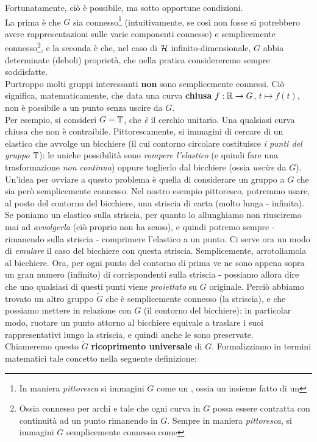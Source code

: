 \documentclass[../../FisicaTeorica.tex]{subfiles}
\begin{document}
Fortunatamente, ciò è possibile, ma sotto opportune condizioni.\\
La prima è che $G$ sia connesso\footnote{In maniera \textit{pittoresca} si immagini $G$ come un , ossia un insieme fatto di un } (intuitivamente, se così non fosse si potrebbero avere rappresentazioni  sulle varie componenti connesse) e semplicemente connesso\footnote{Ossia connesso per archi e tale che ogni curva in $G$ possa essere contratta con continuità ad un punto rimanendo in $G$. Sempre in maniera \textit{pittoresca}, si immagini $G$ semplicemente connesso come }, e la seconda è che, nel caso di $\mathcal{H}$ infinito-dimensionale, $G$ abbia determinate (deboli) proprietà, che nella pratica considereremo sempre soddisfatte.\\

Purtroppo molti gruppi interessanti \textbf{non} sono semplicemente connessi. Ciò significa, matematicamente, che data una curva \textbf{chiusa} $f: \mathbb{R}\to G$, $t \mapsto f(t)$, non è possibile  a un punto senza uscire da $G$.\\
Per esempio, si consideri $G=\mathbb{T}$, che \textit{è} il cerchio unitario. Una qualsiasi curva chiusa che  non è contraibile. Pittorescamente, si immagini di cercare di  un elastico che avvolge un bicchiere (il cui contorno circolare costituisce \textit{i punti del gruppo $\mathbb{T}$}): le uniche possibilità sono \textit{rompere l'elastico} (e quindi fare una trasformazione \textit{non continua}) oppure toglierlo dal bicchiere (ossia \textit{uscire} da $G$).\\

Un'idea per ovviare a questo problema è quella di considerare un gruppo  a $G$ che sia però semplicemente connesso. Nel nostro esempio pittoresco, potremmo usare, al posto del contorno del bicchiere, una striscia di carta (molto lunga - infinita). Se poniamo un elastico sulla striscia, per quanto lo allunghiamo non riusciremo mai ad \textit{avvolgerla} (ciò proprio non ha senso), e quindi potremo sempre - rimanendo sulla striscia - comprimere l'elastico a un punto. Ci serve ora un modo di \textit{emulare} il caso del bicchiere con questa striscia. Semplicemente, arrotoliamola al bicchiere. Ora, per ogni punto del contorno di prima ve ne sono appena sopra un gran numero (infinito) di corrispondenti sulla striscia - possiamo allora dire che uno qualsiasi di questi punti viene \textit{proiettato} su $G$ originale. Perciò abbiamo trovato un altro gruppo $\tilde{G}$ che è semplicemente connesso (la striscia), e che possiamo mettere in relazione con $G$ (il contorno del bicchiere): in particolar modo, ruotare un punto attorno al bicchiere equivale a traslare i suoi rappresentativi lungo la striscia, e quindi anche le  sono preservate.\\
Chiameremo questo $\tilde{G}$ \textbf{ricoprimento universale} di $G$. Formalizziamo in termini matematici tale concetto nella seguente definizione:
\end{document}
